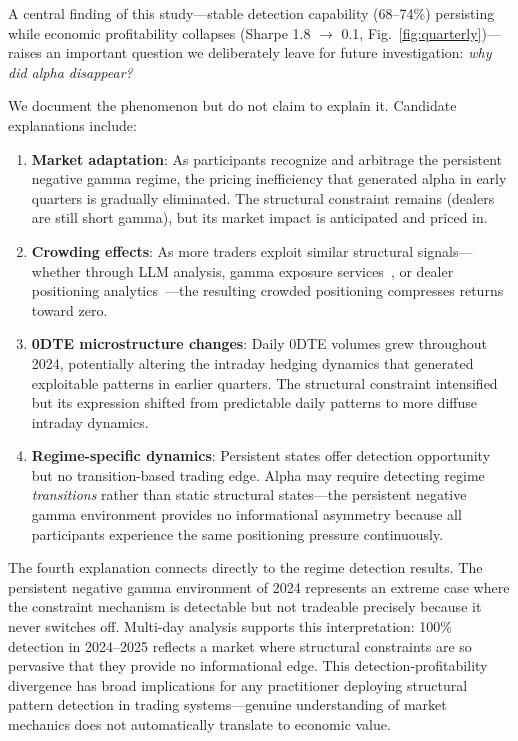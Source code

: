 A central finding of this study---stable detection capability (68--74\%) persisting while economic profitability collapses (Sharpe 1.8 $\rightarrow$ 0.1, Fig.~\ref{fig:quarterly})---raises an important question we deliberately leave for future investigation: \textit{why did alpha disappear?}

We document the phenomenon but do not claim to explain it. Candidate explanations include:

\begin{enumerate}
    \item \textbf{Market adaptation}: As participants recognize and arbitrage the persistent negative gamma regime, the pricing inefficiency that generated alpha in early quarters is gradually eliminated. The structural constraint remains (dealers are still short gamma), but its market impact is anticipated and priced in.
    \item \textbf{Crowding effects}: As more traders exploit similar structural signals---whether through LLM analysis, gamma exposure services~\cite{spotgamma2021}, or dealer positioning analytics~\cite{jpmorgan2023}---the resulting crowded positioning compresses returns toward zero.
    \item \textbf{0DTE microstructure changes}: Daily 0DTE volumes grew throughout 2024, potentially altering the intraday hedging dynamics that generated exploitable patterns in earlier quarters. The structural constraint intensified but its expression shifted from predictable daily patterns to more diffuse intraday dynamics.
    \item \textbf{Regime-specific dynamics}: Persistent states offer detection opportunity but no transition-based trading edge. Alpha may require detecting regime \textit{transitions} rather than static structural states---the persistent negative gamma environment provides no informational asymmetry because all participants experience the same positioning pressure continuously.
\end{enumerate}

The fourth explanation connects directly to the regime detection results. The persistent negative gamma environment of 2024 represents an extreme case where the constraint mechanism is detectable but not tradeable precisely because it never switches off. Multi-day analysis supports this interpretation: 100\% detection in 2024--2025 reflects a market where structural constraints are so pervasive that they provide no informational edge. This detection-profitability divergence has broad implications for any practitioner deploying structural pattern detection in trading systems---genuine understanding of market mechanics does not automatically translate to economic value.


